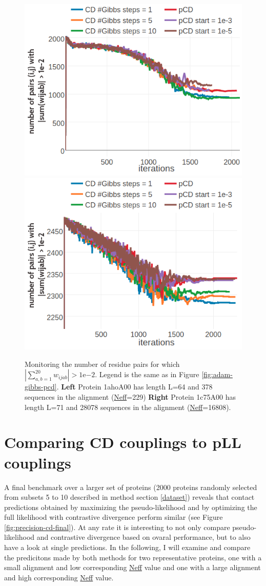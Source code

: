 \documentclass[11pt,a4paper,twoside]{book}
\newcommand{\wijab}{w_{ijab}}
\theoremstyle{definition}
\theoremstyle{definition}
\theoremstyle{remark}
\begin{document}
\begin{figure}

{\centering \includegraphics[width=0.49\linewidth]{img/full_likelihood/adam/1ahoA00_number_ij_sumwijuneqzero} \includegraphics[width=0.49\linewidth]{img/full_likelihood/adam/1c75A00_number_ij_sumwijuneqzero} 

}

\caption{Monitoring the number of residue
pairs for which \(|\sum_{a,b=1}^{20} \wijab| > \mathrm{1e}{-2}\). Legend
is the same as in Figure \ref{fig:adam-gibbs-pcd}. \textbf{Left} Protein
1ahoA00 has length L=64 and 378 sequences in the alignment
(\protect\hyperlink{abbrev}{Neff}=229) \textbf{Right} Protein 1c75A00
has length L=71 and 28078 sequences in the alignment
(\protect\hyperlink{abbrev}{Neff}=16808).}\label{fig:adam-gibbs-pcd-sumwijab}
\end{figure}

\section{Comparing CD couplings to pLL
couplings}\label{comparing-pll-cd}

A final benchmark over a larger set of proteins (2000 proteins randomly
selected from subsets 5 to 10 described in method section \ref{dataset})
reveals that contact predictions obtained by maximizing the
pseudo-likelihood and by optimizing the full likelihood with contrastive
divergence perform similar (see Figure \ref{fig:precision-cd-final}). At
any rate it is interesting to not only compare pseudo-likelihood and
contrastive divergence based on ovaral performance, but to also have a
look at single predictions. In the following, I will examine and compare
the predicitons made by both methods for two representative proteins,
one with a small alignment and low corresponding
\protect\hyperlink{abbrev}{Neff} value and one with a large alignment
and high corresponding \protect\hyperlink{abbrev}{Neff} value.
\end{document}
